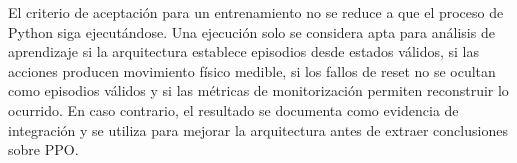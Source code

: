 El criterio de aceptación para un entrenamiento no se reduce a que el proceso de
Python siga ejecutándose. Una ejecución solo se considera apta para análisis de
aprendizaje si la arquitectura establece episodios desde estados válidos, si las acciones
producen movimiento físico medible, si los fallos de reset no se ocultan como
episodios válidos y si las métricas de monitorización permiten reconstruir lo
ocurrido. En caso contrario, el resultado se documenta como evidencia de
integración y se utiliza para mejorar la arquitectura antes de extraer conclusiones
sobre PPO.
